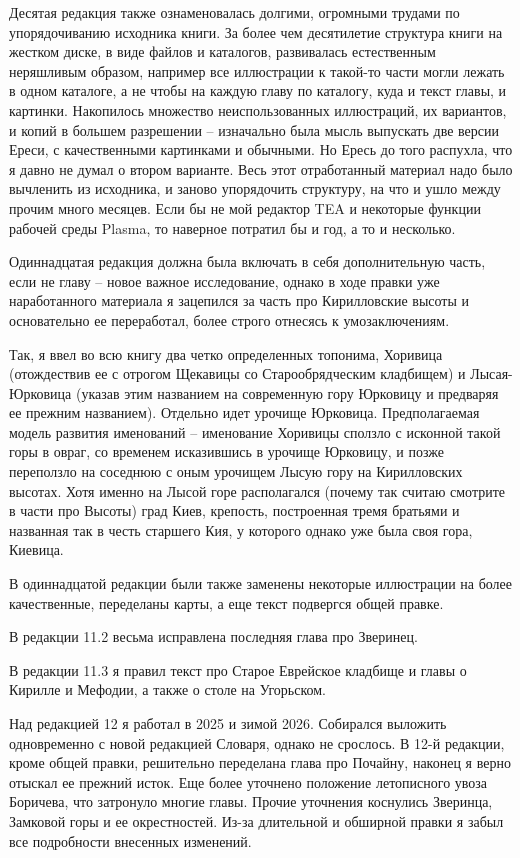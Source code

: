 Десятая редакция также ознаменовалась долгими, огромными трудами по упорядочиванию исходника книги. За более чем десятилетие структура книги на жестком диске, в виде файлов и каталогов, развивалась естественным неряшливым образом, например все иллюстрации к такой-то части могли лежать в одном каталоге, а не чтобы на каждую главу по каталогу, куда и текст главы, и картинки. Накопилось множество неиспользованных иллюстраций, их вариантов, и копий в большем разрешении – изначально была мысль выпускать две версии Ереси, с качественными картинками и обычными. Но Ересь до того распухла, что я давно не думал о втором варианте. Весь этот отработанный материал надо было вычленить из исходника, и заново упорядочить структуру, на что и ушло между прочим много месяцев. Если бы не мой редактор TEA и некоторые функции рабочей среды Plasma, то наверное потратил бы и год, а то и несколько.

Одиннадцатая редакция должна была включать в себя дополнительную часть, если не главу – новое важное исследование, однако в ходе правки уже наработанного материала я зацепился за часть про Кирилловские высоты и основательно ее переработал, более строго отнесясь к умозаключениям. 

Так, я ввел во всю книгу два четко определенных топонима, Хоривица (отождествив ее с отрогом Щекавицы со Старообрядческим кладбищем) и Лысая-Юрковица (указав этим названием на современную гору Юрковицу и предваряя ее прежним названием). Отдельно идет урочище Юрковица. Предполагаемая модель развития именований – именование Хоривицы сползло с исконной такой горы в овраг, со временем исказившись в урочище Юрковицу, и позже переползло на соседнюю с оным урочищем Лысую гору на Кирилловских высотах. Хотя именно на Лысой горе располагался (почему так считаю смотрите в части про Высоты) град Киев, крепость, построенная тремя братьями и названная так в честь старшего Кия, у которого однако уже была своя гора, Киевица.

В одиннадцатой редакции были также заменены некоторые иллюстрации на более качественные, переделаны карты, а еще текст подвергся общей правке.

В редакции 11.2 весьма исправлена последняя глава про Зверинец.

В редакции 11.3 я правил текст про Старое Еврейское кладбище и главы о Кирилле и Мефодии, а также о столе на Угорьском.

Над редакцией 12 я работал в 2025 и зимой 2026. Собирался выложить одновременно с новой редакцией Словаря, однако не срослось. В 12-й редакции, кроме общей правки, решительно переделана глава про Почайну, наконец я верно отыскал ее прежний исток. Еще более уточнено положение летописного увоза Боричева, что затронуло многие главы. Прочие уточнения коснулись Зверинца, Замковой горы и ее окрестностей. Из-за длительной и обширной правки я забыл все подробности внесенных изменений.



